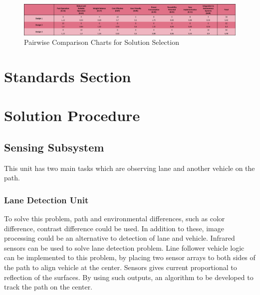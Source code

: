 \documentclass[a4paper,12pt]{article}
\begin{document}
	\begin{figure}[H]
		\centering
		\includegraphics[width=\textwidth,height=\textheight,keepaspectratio]{images/soln_selection} 
		\caption{\label{fig:soln_selection}Pairwise Comparison Charts for Solution Selection}
	\end{figure}





	

\section{Standards Section}


\section{Solution Procedure}
\subsection{Sensing Subsystem}
This unit has two main tasks which are observing lane and another vehicle on the path. 
\subsubsection{Lane Detection Unit }
To solve this problem, path and environmental differences, such as color difference, contrast difference could be used. In addition to these, image processing could be an alternative to detection of lane and vehicle. 
Infrared sensors can be used to solve lane detection problem. Line follower vehicle logic can be implemented to this problem, by placing two sensor arrays to both sides of the path to align vehicle at the center. Sensors gives current proportional to reflection of the surfaces. By using such outputs, an algorithm to be developed to track the path on the center. 
\end{document}
